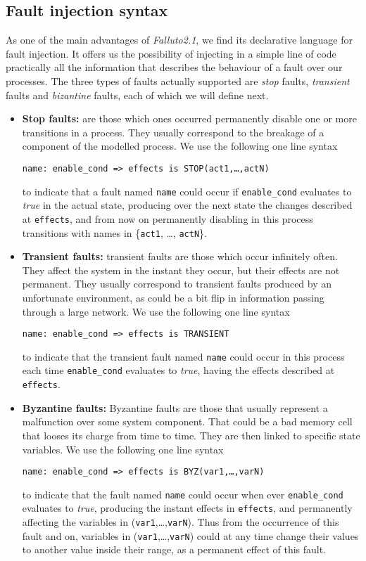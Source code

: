 \documentclass[12pt]{article}
\newcommand{\falluto}{\mbox{\textit{Falluto2.1}}}
\begin{document}
\subsection{Fault injection syntax}
As one of the main advantages of \falluto, we find its declarative language for fault injection. It offers us the possibility of injecting in a simple line of code practically all the information that describes the behaviour of a fault over our processes. The three types of faults actually supported are \textit{stop} faults, \textit{transient} faults and \textit{bizantine} faults, each of which we will define next.
\begin{itemize}

\item \textbf{Stop faults:} are those which ones occurred permanently disable one or more transitions in a process. They usually correspond to the breakage of a component of the modelled process. We use the following one line syntax
\begin{center}
\texttt{name: enable\_cond => effects is STOP(act1,\ldots,actN)}
\end{center}
to indicate that a fault named \texttt{name} could occur if \texttt{enable\_cond} evaluates to \textit{true} in the actual state, producing over the next state the changes described at \texttt{effects}, and from now on permanently disabling in  this process transitions with names in \{\texttt{act1}, \ldots, \texttt{actN}\}.

\item \textbf{Transient faults:} transient faults are those which occur infinitely often. They affect the system in the instant they occur, but their effects are not permanent. They usually correspond to transient faults produced by an unfortunate environment, as could be a bit flip in information passing through a large network. We use the following one line syntax
\begin{center}
\texttt{name: enable\_cond => effects is TRANSIENT}
\end{center}
to indicate that the transient fault named \texttt{name} could occur in this process each time \texttt{enable\_cond} evaluates to \textit{true}, having the effects described at \texttt{effects}.

\item \textbf{Byzantine faults:} Byzantine faults are those that usually represent a malfunction over some system component. That could be a bad memory cell that looses its charge from time to time. They are then linked to specific state variables. We use the following one line syntax
\begin{center}
\texttt{name: enable\_cond => effects is BYZ(var1,\ldots,varN)}
\end{center}
to indicate that the fault named \texttt{name} could occur when ever \texttt{enable\_cond} evaluates to \textit{true}, producing the instant effects in \texttt{effects}, and permanently affecting the variables in (\texttt{var1},\ldots,\texttt{varN}). Thus from the occurrence of this fault and on, variables in (\texttt{var1},\ldots,\texttt{varN}) could at any time change their values to another value inside their range, as a permanent effect of this fault.
\end{itemize}
\end{document}
